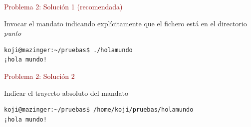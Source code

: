 \documentclass[ucs]{beamer}
\newcommand{\res}[1]{\textcolor{darkred}{#1}}
\begin{document}
\begin{frame}[fragile]
\res{Problema 2: Solución 1 (recomendada)}


Invocar el mandato indicando explícitamente que el fichero
está en el directorio \emph{punto}
\begin{footnotesize}
\begin{verbatim}
koji@mazinger:~/pruebas$ ./holamundo 
¡hola mundo!
\end{verbatim}
\end{footnotesize}



\res{Problema 2: Solución 2}

Indicar el trayecto absoluto del mandato


\begin{footnotesize}
\begin{verbatim}
koji@mazinger:~/pruebas$ /home/koji/pruebas/holamundo 
¡hola mundo!
\end{verbatim}
\end{footnotesize}


\begin{footnotesize}
\begin{verbatim}
\end{verbatim}
\end{footnotesize}


\begin{footnotesize}
\begin{verbatim}
\end{verbatim}
\end{footnotesize}


\end{frame}
\end{document}
